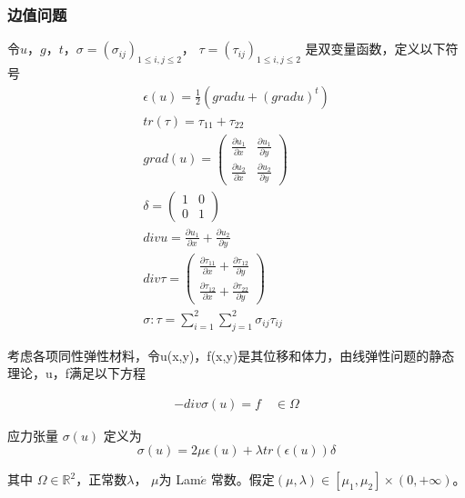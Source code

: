 \documentclass[a4paper,UTF8,titlepage]{ctexart}
\begin{document}
\subsubsection{边值问题}

令$u$，$g$，$t$，$\sigma=(\sigma_{ij})_{1 \le i,j \le 2}$， $\tau = (\tau_{ij})_{1\le i,j \le 2}$ 是双变量函数，定义以下符号
$$
\begin{matrix}
	\epsilon(u) = \frac{1}{2} (grad u + (grad u)^t) \\
	tr(\tau) = \tau_{11} + \tau_{22} \\
	grad(u) = \begin{pmatrix}
		\frac{\partial u_1}{\partial x} & \frac{\partial u_1}{\partial y} \\
		\frac{\partial u_2}{\partial x} &
		\frac{\partial u_2}{\partial y}
	\end{pmatrix} \\
	\delta = \begin{pmatrix}
		1 & 0 \\
		0 & 1
	\end{pmatrix} \\
	div u = \frac{\partial u_1}{\partial x} + \frac{\partial u_2}{\partial y} \\
	div \tau = \begin{pmatrix}
		\frac{\partial \tau_{11}}{\partial x} + \frac{\partial \tau_{12}}{\partial y} \\
		\frac{\partial \tau_{12}}{\partial x} + \frac{\partial \tau_{22}}{\partial 
			y} 
	\end{pmatrix} \\
	\sigma : \tau = \sum\limits_{i=1}^{2} \sum\limits_{j=1}^{2} \sigma_{ij} \tau_{ij}
\end{matrix}
$$

考虑各项同性弹性材料，令u(x,y)，f(x,y)是其位移和体力，由线弹性问题的静态理论，u，f满足以下方程

\begin{equation}
\begin{aligned}
	-div \sigma(u) = f \quad  \in \Omega 
\end{aligned}
\label{elasiticityEq}
\end{equation}

应力张量 $\sigma(u)$ 定义为
\begin{equation}
\sigma(u) = 2 \mu \epsilon(u) + \lambda tr(\epsilon(u)) \delta
\end{equation}

其中 $\Omega \in \mathbb{R}^2$，正常数$\lambda$， $\mu$为 Lam$\acute{e}$ 常数。假定$(\mu, \lambda) \in [\mu_1,\mu_2] \times (0, +\infty)$。
\end{document}
